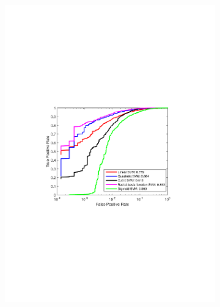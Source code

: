 \begin{figure}[h]
  \centering
  \begin{subfigure}[b]{0.49\textwidth}
   \includegraphics[width=\textwidth]{figures/SVM.pdf}
    \caption{}
    \label{fig:SVM}
  \end{subfigure}
  \begin{subfigure}[b]{0.49\textwidth}

\end{subfigure}
\end{figure}
